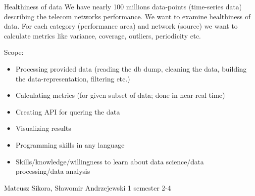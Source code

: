 \begin{project}
{Healthiness of data}
{We have nearly 100 millions data-points (time-series data) describing the telecom networks performance. We want to examine healthiness of data. For each category (performance area) and network (source) we want to calculate metrics like variance, coverage, outliers, periodicity etc.} 
{
Scope:
\begin{itemize}
	\item Processing provided data (reading the db dump, cleaning the data, building the data-representation, filtering etc.)
	\item Calculating metrics (for given subset of data; done in near-real time)
	\item Creating API for quering the data
	\item Visualizing results
\end{itemize}
}
{
\begin{itemize}
	\item Programming skills in any language
	\item Skills/knowledge/willingness to learn about data science/data processing/data analysis
\end{itemize}
}
{Mateusz Sikora, Sławomir Andrzejewski}
{1 semester}
{2-4}
\end{project}
